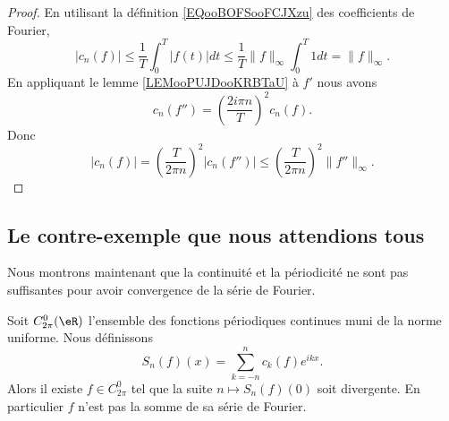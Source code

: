 \begin{proof}
	En utilisant la définition \eqref{EQooBOFSooFCJXzu} des coefficients de Fourier,
	\begin{equation}
		| c_n(f) |\leq \frac{1}{ T }\int_0^T| f(t) |dt\leq \frac{ 1 }{ T }\| f \|_{\infty}\int_0^T1dt=\| f \|_{\infty}.
	\end{equation}
	En appliquant le lemme \ref{LEMooPUJDooKRBTaU} à \( f'\) nous avons
	\begin{equation}
		c_n(f'')=\left( \frac{ 2i\pi n }{ T } \right)^2c_n(f).
	\end{equation}
	Donc
	\begin{equation}
		| c_n(f) |=\left( \frac{ T }{ 2\pi n } \right)^2| c_n(f'') |\leq \left( \frac{ T }{ 2\pi n } \right)^2\| f'' \|_{\infty}.
	\end{equation}
\end{proof}


\subsection{Le contre-exemple que nous attendions tous}

Nous montrons maintenant que la continuité et la périodicité ne sont pas suffisantes pour avoir convergence de la série de Fourier.

\begin{proposition} \label{PropREkHdol}
	Soit \( C^0_{2\pi}(\eR)\) l'ensemble des fonctions périodiques continues muni de la norme uniforme. Nous définissons
	\begin{equation}
		S_n(f)(x)=\sum_{k=-n}^nc_k(f) e^{ikx}.
	\end{equation}
	Alors il existe \( f\in C^0_{2\pi}\) tel que la suite \(n\mapsto S_n(f)(0)\) soit divergente. En particulier \( f\) n'est pas la somme de sa série de Fourier.
\end{proposition}

